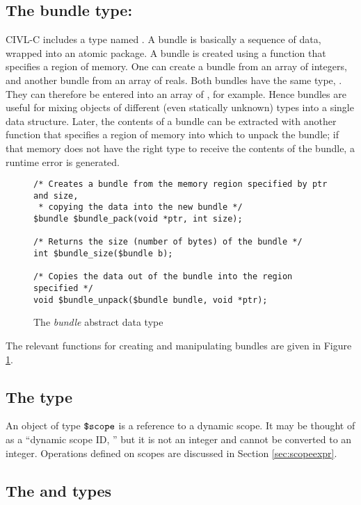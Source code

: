 \subsection{The bundle type: \cbundle}

CIVL-C includes a type named \cbundle. A bundle is basically a
sequence of data, wrapped into an atomic package. A bundle is created
using a function that specifies a region of memory. One can create a
bundle from an array of integers, and another bundle from an array of
reals. Both bundles have the same type, \cbundle. They can therefore
be entered into an array of \cbundle, for example. Hence bundles are
useful for mixing objects of different (even statically unknown) types
into a single data structure. Later, the contents of a bundle can be
extracted with another function that specifies a region of memory into
which to unpack the bundle; if that memory does not have the right
type to receive the contents of the bundle, a runtime error is
generated.

\begin{figure}
\begin{verbatim}
/* Creates a bundle from the memory region specified by ptr and size,
 * copying the data into the new bundle */
$bundle $bundle_pack(void *ptr, int size);

/* Returns the size (number of bytes) of the bundle */
int $bundle_size($bundle b);

/* Copies the data out of the bundle into the region specified */
void $bundle_unpack($bundle bundle, void *ptr);
\end{verbatim}
  \caption{The \emph{bundle} abstract data type}
  \label{fig:bundle}
\end{figure}

The relevant functions for creating and manipulating bundles
are given in Figure \ref{fig:bundle}.

\subsection{The \cscope{} type}
\label{sec:scopetype}

An object of type $\mbox{\texttt{\${}scope}}$ is a reference to a dynamic scope.  It may
be thought of as a ``dynamic scope ID, '' but it is not an integer and
cannot be converted to an integer.  Operations defined on scopes are
discussed in Section \ref{sec:scopeexpr}.

\subsection{The \crange{} and \cdomain{} types}

